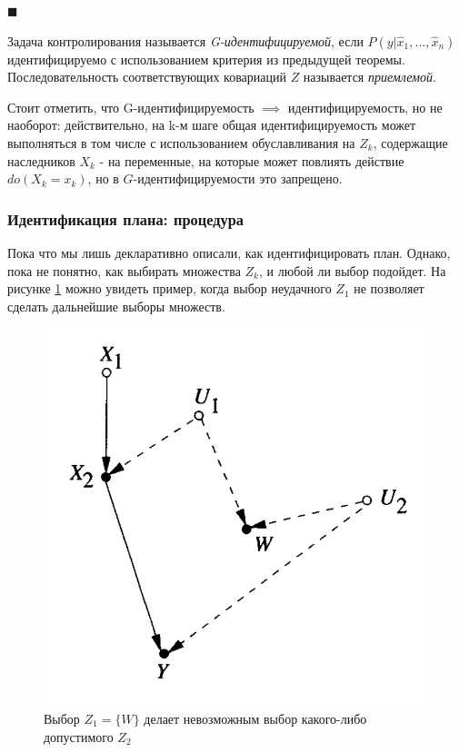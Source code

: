 \documentclass[fleqn]{article}
\numberwithin{equation}{section}
\numberwithin{theorem}{section}
\numberwithin{figure}{section}
\numberwithin{lemma}{section}
\begin{document}
$\blacksquare$

Задача контролирования называется \textit{G-идентифицируемой}, если $P(y|\hat x_1,...,\hat x_n)$ идентифицируемо с использованием критерия из предыдущей теоремы. Последовательность соответствующих ковариаций $Z$ называется \textit{приемлемой}. 

Стоит отметить, что G-идентифицируемость $\implies$ идентифицируемость, но не наоборот: действительно, на k-м шаге общая идентифицируемость может выполняться в том числе с использованием обуславливания  на $Z_k$, содержащие наследников $X_k$ - на переменные, на которые может повлиять действие $do(X_k=x_k)$, но в $G$-идентифицируемости это запрещено.

\subsubsection*{Идентификация плана: процедура}

Пока что мы лишь декларативно описали, как идентифицировать план. Однако, пока не понятно, как выбирать множества $Z_k$, и любой ли выбор подойдет. На рисунке \ref{fig:bad_admissible_set} можно увидеть пример, когда выбор неудачного $Z_1$ не позволяет сделать дальнейшие выборы множеств.

\begin{figure}[h]
\begin{center}
\includegraphics[scale=0.6]{imgs/img27.png}
\end{center}
\caption{Выбор $Z_1=\{W\}$ делает невозможным выбор какого-либо допустимого $Z_2$}
\label{fig:bad_admissible_set}
\end{figure}
 
\end{document}
